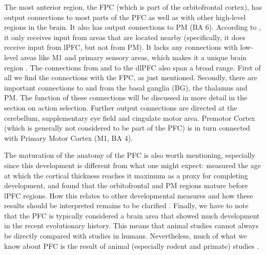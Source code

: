 \documentclass[10pt,a4paper]{report}
\begin{document}
The most anterior region, the FPC (which is part of the orbitofrontal cortex), has output connections to most parts of the PFC as well as with other high-level regions in the brain. It also has output connections to PM (BA 6). According to \citet{Badre2009}, it only receives input from areas that are located nearby (specifically, it does receive input from lPFC, but not from PM). It lacks any connections with low-level areas like M1 and primary sensory areas, which makes it a unique brain region \citep{Ramnani2004}. The connections from and to the dlPFC also span a broad range. First of all we find the connections with the FPC, as just mentioned. Secondly, there are important connections to and from the basal ganglia (BG), the thalamus and PM. The function of these connections will be discussed in more detail in the section on action selection. Further output connections are directed at the cerebellum, supplementary eye field and cingulate motor area. Premotor Cortex (which is generally not considered to be part of the PFC) is in turn connected with Primary Motor Cortex (M1, BA 4). 

The maturation of the anatomy of the PFC is also worth mentioning, especially since this development is different from what one might expect: \citet{Shaw2008} measured the age at which the cortical thickness reaches it maximum as a proxy for completing development, and found that the orbitofrontal and PM regions mature before lPFC regions. How this relates to other developmental measures and how these results should be interpreted remains to be clarified \citep{Wendelken2011, Diamond2002}. Finally, we have to note that the PFC is typically considered a brain area that showed much development in the recent evolutionary history. This means that animal studies cannot always be directly compared with studies in humans. Nevertheless, much of what we know about PFC is the result of animal (especially rodent and primate) studies \citep{Uylings1990, Rilling2006}.
\end{document}
